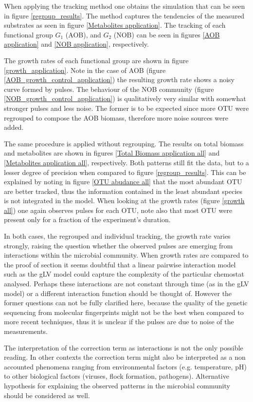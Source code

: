 \documentclass[3p,times]{article}
\begin{document}
When applying the tracking method one obtains the simulation that can be seen in figure \ref{regroup_results}. The method captures the tendencies of the measured substrates as seen in figure \ref{Metabolites application}. The tracking of each functional group $G_1$ (AOB), and $G_2$ (NOB) can be seen in figures \ref{AOB application} and \ref{NOB application}, respectively. 

The growth rates of each functional group are shown in figure \ref{growth_application}. Note in the case of AOB (figure \ref{AOB_growth_control_application}) the resulting growth rate shows a noisy curve formed by pulses. The behaviour of the NOB community (figure \ref{NOB_growth_control_application}) is qualitatively very similar with somewhat stronger pulses and less noise. The former is to be expected since more OTU were regrouped to compose the AOB biomass, therefore more noise sources were added. 

The same procedure is applied without regrouping. The results on total biomass and metabolites are shown in figures \ref{Total Biomass application all} and \ref{Metabolites application all}, respectively. Both patterns still fit the data, but to a lesser degree of precision when compared to figure \ref{regroup_results}. This can be explained by noting in figure \ref{OTU abudance all} that the most abundant OTU are better tracked, thus the information contained in the least abundant species is not integrated in the model. When looking at the growth rates (figure \ref{growth all}) one again observes pulses for each OTU, note also that most OTU were present only for a fraction of the experiment's duration. 

In both cases, the regrouped and individual tracking, the growth rate varies strongly, raising the question whether the observed pulses are emerging from interactions within the microbial community. When growth rates are compared to the proof of section it seems doubtful that a linear pairwise interaction model such as the gLV model could capture the complexity of the particular chemostat analysed. Perhaps these interactions are not constant through time (as in the gLV model) or a different interaction function should be thought of. However the former questions can not be fully clarified here, because the quality of the genetic sequencing from molecular fingerprints might not be the best when compared to more recent techniques, thus it is unclear if the pulses are due to noise of the measurements.

The interpretation of the correction term as interactions is not the only possible reading. In other contexts the correction term might also be interpreted as a non accounted phenomena ranging from environmental factors (e.g. temperature, pH) to other biological factors (viruses, flock formation, pathogens). Alternative hypothesis for explaining the observed patterns in the microbial community should be considered as well. 
\end{document}
